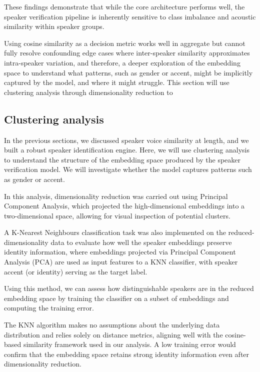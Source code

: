 \documentclass[conference]{IEEEtran}
\begin{document}
These findings demonstrate that while the core architecture performs well, the speaker verification pipeline is inherently sensitive to class imbalance and acoustic similarity within speaker groups. 

Using cosine similarity as a decision metric works well in aggregate but cannot fully resolve confounding edge cases where inter-speaker similarity approximates intra-speaker variation, and therefore, a deeper exploration of the embedding space to understand what patterns, such as gender or accent, might be implicitly captured by the model, and where it might struggle. This section will use clustering analysis through dimensionality reduction to 

\subsection{Clustering analysis}

In the previous sections, we discussed speaker voice similarity at length, and we built a robust speaker identification engine. Here, we will use clustering analysis to understand the structure of the embedding space produced by the speaker verification model. We will investigate whether the model captures patterns such as gender or accent.

In this analysis, dimensionality reduction was carried out using Principal Component Analysis, which projected the high-dimensional embeddings into a two-dimensional space, allowing for visual inspection of potential clusters.

A K-Nearest Neighbours classification task was also implemented on the reduced-dimensionality data to evaluate how well the speaker embeddings preserve identity information, where embeddings projected via Principal Component Analysis (PCA) are used as input features to a KNN classifier, with speaker accent (or identity) serving as the target label. 

Using this method, we can assess how distinguishable speakers are in the reduced embedding space by training the classifier on a subset of embeddings and computing the training error. 

The KNN algorithm makes no assumptions about the underlying data distribution and relies solely on distance metrics, aligning well with the cosine-based similarity framework used in our analysis. A low training error would confirm that the embedding space retains strong identity information even after dimensionality reduction.
\end{document}
